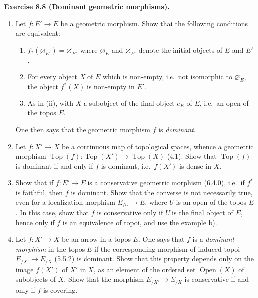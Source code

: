 \documentclass[11pt]{article}
\newcommand{\Top}{\operatorname{Top}}
\newcommand{\ouv}{\operatorname{Open}}
\newcommand{\ie}{i.e.}
\newenvironment{remarktext}[1]{\par\medskip\noindent\textbf{#1.}\ }{\par\medskip}
\begin{document}
\begin{remarktext}{Exercise 8.8 (Dominant geometric morphisms)}
\begin{enumerate}[label=\alph*)]
\item Let \(f:E'\to E\) be a geometric morphism. Show that the following conditions are equivalent:
\begin{enumerate}[label=(\roman*)]
\item \(f_*(\varnothing_{E'})=\varnothing_E\), where \(\varnothing_E\) and \(\varnothing_{E'}\) denote the initial objects of \(E\) and \(E'\).
\item For every object \(X\) of \(E\) which is non-empty, \ie\ not isomorphic to \(\varnothing_E\), the object \(f^*(X)\) is non-empty in \(E'\).
\item As in (ii), with \(X\) a subobject of the final object \(e_E\) of \(E\), \ie\ an open of the topos \(E\).
\end{enumerate}
One then says that the geometric morphism \(f\) is \emph{dominant}.

\item Let \(f:X'\to X\) be a continuous map of topological spaces, whence a geometric morphism \(\Top(f):\Top(X')\to\Top(X)\) (4.1). Show that \(\Top(f)\) is dominant if and only if \(f\) is dominant, \ie\ \(f(X')\) is dense in \(X\).

\item Show that if \(f:E'\to E\) is a conservative geometric morphism (6.4.0), \ie\ if \(f^*\) is faithful, then \(f\) is dominant. Show that the converse is not necessarily true, even for a localization morphism \(E_{/U}\to E\), where \(U\) is an open of the topos \(E\). In this case, show that \(f\) is conservative only if \(U\) is the final object of \(E\), hence only if \(f\) is an equivalence of topoi, and use the example b).

\item Let \(f:X'\to X\) be an arrow in a topos \(E\). One says that \(f\) is a \emph{dominant morphism} in the topos \(E\) if the corresponding morphism of induced topoi \(E_{/X'}\to E_{/X}\) (5.5.2) is dominant. Show that this property depends only on the image \(f(X')\) of \(X'\) in \(X\), as an element of the ordered set \(\ouv(X)\) of subobjects of \(X\). Show that the morphism \(E_{/X'}\to E_{/X}\) is conservative if and only if \(f\) is covering.
\end{enumerate}
\end{remarktext}

\bigskip
\end{document}
